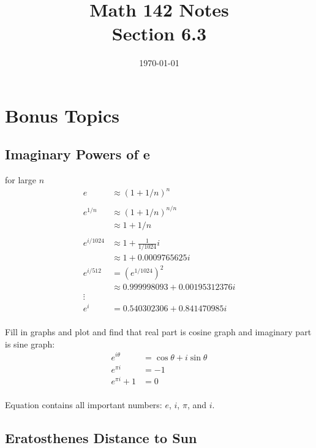 \documentclass{exam}
\title{Math 142 Notes \\ Section 6.3}
\date{\today}
\begin{document}
  \maketitle
  \tableofcontents

  \section{Bonus Topics}
  \subsection{Imaginary Powers of e}

  for large $n$
  \begin{align*}
    e       & \approx \left( 1 + 1/n \right)^n \\
    \\
    e^{1/n} & \approx \left( 1 + 1/n \right)^{n/n} \\
            & \approx 1 + 1/n \\
    \\
    e^{i/1024} & \approx 1 + \frac{1}{1/1024} i \\
               & \approx 1 + 0.0009765625 i \\
    e^{i/512}  & = \left( e^{1/1024} \right)^2 \\
               & \approx 0.999998093 + 0.00195312376 i \\
    \vdots \\
    e^{i} &= 0.540302306 + 0.841470985 i \\
  \end{align*}

  Fill in graphs and plot and find that real part is cosine graph and imaginary part is sine graph:
  \begin{align*}
    e^{i \theta}  & = \cos \theta + i \sin \theta \\
    e^{\pi i}     & = -1 \\
    e^{\pi i} + 1 & = 0 \\
  \end{align*}

  Equation contains all important numbers: $e$, $i$, $\pi$, and $i$.

  \subsection{Eratosthenes Distance to Sun}
\end{document}
